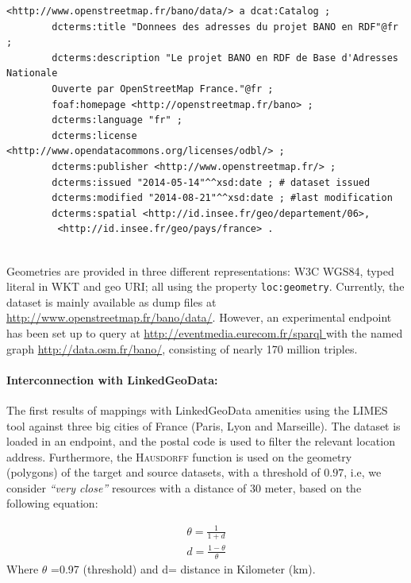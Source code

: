 \begin{lstlisting}
<http://www.openstreetmap.fr/bano/data/> a dcat:Catalog ;
		dcterms:title "Donnees des adresses du projet BANO en RDF"@fr ;
		dcterms:description "Le projet BANO en RDF de Base d'Adresses Nationale
		Ouverte par OpenStreetMap France."@fr ;
		foaf:homepage <http://openstreetmap.fr/bano> ;
		dcterms:language "fr" ;
		dcterms:license <http://www.opendatacommons.org/licenses/odbl/> ;
		dcterms:publisher <http://www.openstreetmap.fr/> ;
		dcterms:issued "2014-05-14"^^xsd:date ; # dataset issued
		dcterms:modified "2014-08-21"^^xsd:date ; #last modification
		dcterms:spatial <http://id.insee.fr/geo/departement/06>,
		 <http://id.insee.fr/geo/pays/france> .
		
\end{lstlisting}

Geometries are provided in three different representations: W3C WGS84, typed literal in WKT and geo URI; all using the property \texttt{loc:geometry}. Currently, the dataset is mainly available as dump files at \url{http://www.openstreetmap.fr/bano/data/}. However, an experimental endpoint has been set up to query at \url{http://eventmedia.eurecom.fr/sparql } with the named graph \url{http://data.osm.fr/bano/}, consisting of nearly 170 million triples.

\paragraph{Interconnection with LinkedGeoData:}
The first results of mappings with LinkedGeoData amenities using the LIMES tool against three big cities of France (Paris, Lyon and Marseille). The dataset is loaded in an endpoint, and the postal code is used to filter the relevant location address. Furthermore, the \textsc{Hausdorff} function is used on the geometry (polygons) of the target and source datasets, with a threshold of $0.97$, i.e, we consider \textit{``very close''} resources with a distance of 30 meter, based on the following equation:

\begin{align*}
\theta = \frac{1}{1+d} \\
 d	= \frac{1-\theta}{\theta}
\end{align*}
Where $\theta$ =0.97 (threshold) and d= distance in Kilometer (km).

